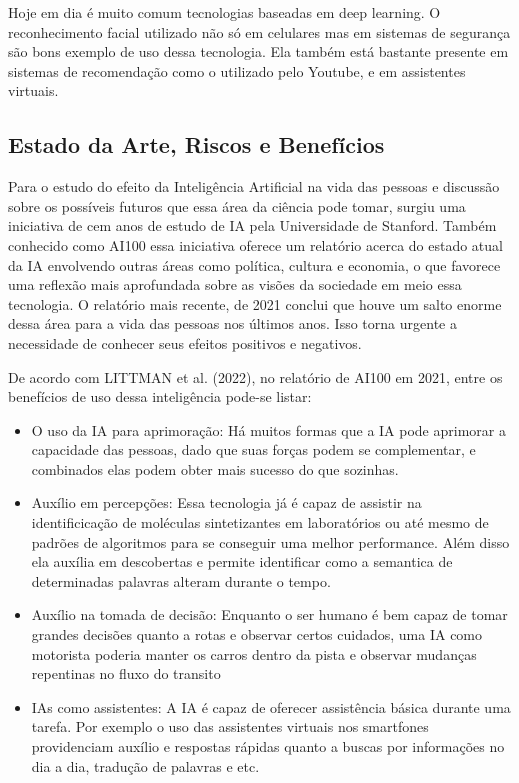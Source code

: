 \documentclass[a4paper,12pt]{article}
\begin{document}
Hoje em dia é muito comum tecnologias baseadas em deep learning. O reconhecimento facial utilizado não só em celulares mas em sistemas de segurança são bons exemplo de uso dessa tecnologia. Ela também está bastante presente em sistemas de recomendação como o utilizado pelo Youtube, e em assistentes virtuais. 

\subsection{Estado da Arte, Riscos e Benefícios}

Para o estudo do efeito da Inteligência Artificial na vida das pessoas e discussão sobre os possíveis futuros que essa área da ciência pode tomar, surgiu uma iniciativa de cem anos de estudo de IA pela Universidade de Stanford. Também conhecido como AI100 essa iniciativa oferece um relatório acerca do estado atual da IA envolvendo outras áreas como política, cultura e economia, o que favorece uma reflexão mais aprofundada sobre as visões da sociedade em meio essa tecnologia. O relatório mais recente, de 2021 conclui que houve um salto enorme dessa área para a vida das pessoas nos últimos anos. Isso torna urgente a necessidade de conhecer seus efeitos positivos e negativos.

De acordo com LITTMAN et al. (2022), no relatório de AI100 em 2021, entre os benefícios de uso dessa inteligência pode-se listar:

\begin{itemize}
    \item O uso da IA para aprimoração: Há muitos formas que a IA pode aprimorar a capacidade das pessoas, dado que suas forças podem se complementar, e combinados elas podem obter mais sucesso do que sozinhas.

    \item Auxílio em percepções: Essa tecnologia já é capaz de assistir na identificicação de moléculas sintetizantes em laboratórios ou até mesmo de padrões de algoritmos para se conseguir uma melhor performance. Além disso ela auxília em descobertas e permite identificar como a semantica de determinadas palavras alteram durante o tempo.

    \item Auxílio na tomada de decisão: Enquanto o ser humano é bem capaz de tomar grandes decisões quanto a rotas e observar certos cuidados, uma IA como motorista poderia manter os carros dentro da pista e observar mudanças repentinas no fluxo do transito

    \item IAs como assistentes: A IA é capaz de oferecer assistência básica durante uma tarefa. Por exemplo o uso das assistentes virtuais nos smartfones providenciam auxílio e respostas rápidas quanto a buscas por informações no dia a dia, tradução de palavras e etc.
\end{itemize}
\end{document}
